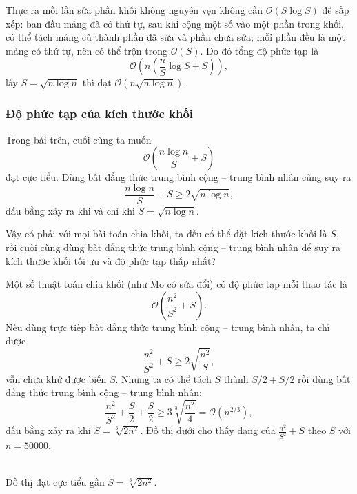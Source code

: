 \documentclass[11pt]{article}
\newcommand{\Oh}{\mathcal{O}}
\begin{document}
Thực ra mỗi lần sửa phần khối không nguyên vẹn không cần \(\Oh(S\log S)\) để
sắp xếp: ban đầu mảng đã có thứ tự, sau khi cộng một số vào một phần trong
khối, có thể tách mảng cũ thành phần đã sửa và phần chưa sửa; mỗi phần đều là
một mảng có thứ tự, nên có thể trộn trong \(\Oh(S)\). Do đó tổng độ phức tạp
là
\[
  \Oh\left(n\left(\frac nS\log S+S\right)\right),
\]
lấy \(S=\sqrt{n\log n}\) thì đạt \(\Oh(n\sqrt{n\log n})\).

\subsubsection{Độ phức tạp của kích thước khối}

Trong bài trên, cuối cùng ta muốn
\[
  \Oh\left(\frac{n\log n}{S}+S\right)
\]
đạt cực tiểu. Dùng bất đẳng thức trung bình cộng -- trung bình nhân cũng suy
ra
\[
  \frac{n\log n}{S}+S\ge 2\sqrt{n\log n},
\]
dấu bằng xảy ra khi và chỉ khi \(S=\sqrt{n\log n}\).

Vậy có phải với mọi bài toán chia khối, ta đều có thể đặt kích thước khối là
\(S\), rồi cuối cùng dùng bất đẳng thức trung bình cộng -- trung bình nhân để
suy ra kích thước khối tối ưu và độ phức tạp thấp nhất?

Một số thuật toán chia khối (như Mo có sửa đổi) có độ phức tạp mỗi thao tác
là
\[
  \Oh\left(\frac{n^2}{S^2}+S\right).
\]
Nếu dùng trực tiếp bất đẳng thức trung bình cộng -- trung bình nhân, ta chỉ
được
\[
  \frac{n^2}{S^2}+S\ge 2\sqrt{\frac{n^2}{S}},
\]
vẫn chưa khử được biến \(S\). Nhưng ta có thể tách \(S\) thành \(S/2+S/2\)
rồi dùng bất đẳng thức trung bình cộng -- trung bình nhân:
\[
  \frac{n^2}{S^2}+\frac S2+\frac S2
  \ge 3\sqrt[3]{\frac{n^2}{4}}
  =
  \Oh(n^{2/3}),
\]
dấu bằng xảy ra khi \(S=\sqrt[3]{2n^2}\). Đồ thị dưới cho thấy dạng của
\(\frac{n^2}{S^2}+S\) theo \(S\) với \(n=50000\).

\begin{center}
\\[-0.2em]
{\small Đồ thị đạt cực tiểu gần \(S=\sqrt[3]{2n^2}\).}
\end{center}
\end{document}
